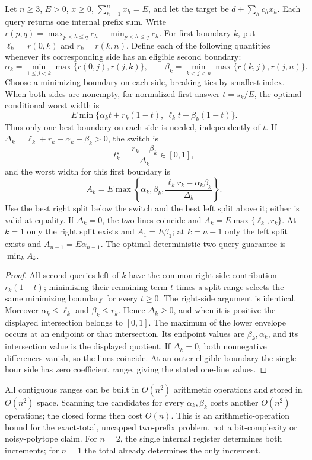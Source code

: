 \begin{proposition}
Let $n\geq3$, $E>0$, $x\geq0$, $\sum_{h=1}^n x_h=E$, and let the target be
$d+\sum_hc_hx_h$. Each query returns one internal prefix sum. Write
$r(p,q)=\max_{p<h\leq q}c_h-\min_{p<h\leq q}c_h$.
For first boundary $k$, put $\ell_k=r(0,k)$ and $r_k=r(k,n)$.
Define each of the following quantities whenever its corresponding
side has an eligible second boundary:
\[
 \alpha_k=\min_{1\leq j<k}\max\{r(0,j),r(j,k)\},\qquad
 \beta_k=\min_{k<j<n}\max\{r(k,j),r(j,n)\}.
\]
Choose a minimizing boundary on each side, breaking ties by smallest index.
When both sides are nonempty, for normalized first answer $t=s_k/E$,
the optimal conditional worst width is
\[
 E\min\{\alpha_k t+r_k(1-t),\ \ell_k t+\beta_k(1-t)\}.
\]
Thus only one best boundary on each side is needed, independently of $t$.
If $\Delta_k=\ell_k+r_k-\alpha_k-\beta_k>0$, the switch is
\[
 t_k^\star=\frac{r_k-\beta_k}{\Delta_k}\in[0,1],
\]
and the worst width for this first boundary is
\[
 A_k=E\max\left\{\alpha_k,\beta_k,
          \frac{\ell_kr_k-\alpha_k\beta_k}{\Delta_k}\right\}.
\]
Use the best right split below the switch and the best left split above
it; either is valid at equality. If $\Delta_k=0$, the two lines coincide
and $A_k=E\max\{\ell_k,r_k\}$. At $k=1$ only the right split exists and
$A_1=E\beta_1$; at $k=n-1$ only the left split exists and
$A_{n-1}=E\alpha_{n-1}$. The optimal deterministic two-query guarantee is
$\min_k A_k$.
\end{proposition}
\begin{proof}
All second queries left of $k$ have the common right-side contribution
$r_k(1-t)$; minimizing their remaining term $t$ times a split range
selects the same minimizing boundary for every $t\geq0$. The right-side
argument is identical. Moreover $\alpha_k\leq\ell_k$ and
$\beta_k\leq r_k$. Hence $\Delta_k\geq0$, and when it is positive the
displayed intersection belongs to $[0,1]$. The maximum of the lower
envelope occurs at an endpoint or that intersection. Its endpoint
values are $\beta_k,\alpha_k$, and its intersection value is the displayed
quotient. If $\Delta_k=0$, both nonnegative differences vanish, so the
lines coincide. At an outer eligible boundary the single-hour side has
zero coefficient range, giving the stated one-line values.
\end{proof}

All contiguous ranges can be built in $O(n^2)$ arithmetic operations
and stored in $O(n^2)$ space. Scanning the candidates for every
$\alpha_k,\beta_k$ costs another $O(n^2)$ operations; the closed forms
then cost $O(n)$. This is an arithmetic-operation bound for the exact-total,
uncapped two-prefix problem, not a bit-complexity or noisy-polytope claim.
For $n=2$, the single internal register determines both increments;
for $n=1$ the total already determines the only increment.

